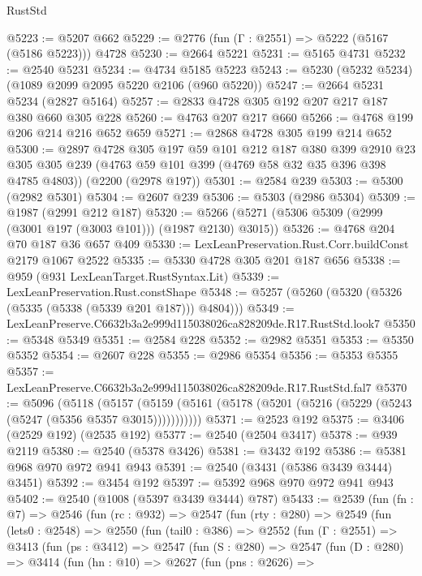 \begin{lexlean}{RustStd}
\begin{coremodule}
@5223 := @5207 @662
@5229 := @2776 (fun (Γ : @2551) => @5222 (@5167 (@5186 @5223))) @4728
@5230 := @2664 @5221
@5231 := @5165 @4731
@5232 := @2540 @5231
@5234 := @4734 @5185 @5223
@5243 := @5230 (@5232 @5234) (@1089 @2099 @2095 @5220 @2106 (@960 @5220))
@5247 := @2664 @5231 @5234 (@2827 @5164)
@5257 := @2833 @4728 @305 @192 @207 @217 @187 @380 @660 @305 @228
@5260 := @4763 @207 @217 @660
@5266 := @4768 @199 @206 @214 @216 @652 @659
@5271 := @2868 @4728 @305 @199 @214 @652
@5300 := @2897
    @4728
    @305
    @197
    @59
    @101
    @212
    @187
    @380
    @399
    @2910
    @23
    @305
    @305
    @239
    (@4763 @59 @101 @399 (@4769 @58 @32 @35 @396 @398 @4785 @4803))
    (@2200 (@2978 @197))
@5301 := @2584 @239
@5303 := @5300 (@2982 @5301)
@5304 := @2607 @239
@5306 := @5303 (@2986 @5304)
@5309 := @1987 (@2991 @212 @187)
@5320 := @5266 (@5271 (@5306 @5309 (@2999 (@3001 @197 (@3003 @101))) (@1987 @2130) @3015))
@5326 := @4768 @204 @70 @187 @36 @657 @409
@5330 := LexLeanPreservation.Rust.Corr.buildConst @2179 @1067 @2522
@5335 := @5330 @4728 @305 @201 @187 @656
@5338 := @959 (@931 LexLeanTarget.RustSyntax.Lit)
@5339 := LexLeanPreservation.Rust.constShape
@5348 := @5257 (@5260 (@5320 (@5326 (@5335 (@5338 (@5339 @201 @187))) @4804)))
@5349 := LexLeanPreserve.C6632b3a2e999d115038026ca828209de.R17.RustStd.look7
@5350 := @5348 @5349
@5351 := @2584 @228
@5352 := @2982 @5351
@5353 := @5350 @5352
@5354 := @2607 @228
@5355 := @2986 @5354
@5356 := @5353 @5355
@5357 := LexLeanPreserve.C6632b3a2e999d115038026ca828209de.R17.RustStd.fal7
@5370 := @5096
    (@5118
      (@5157 (@5159 (@5161 (@5178 (@5201 (@5216 (@5229 (@5243 (@5247 (@5356 @5357 @3015)))))))))))
@5371 := @2523 @192
@5375 := @3406 (@2529 @192) (@2535 @192)
@5377 := @2540 (@2504 @3417)
@5378 := @939 @2119
@5380 := @2540 (@5378 @3426)
@5381 := @3432 @192
@5386 := @5381 @968 @970 @972 @941 @943
@5391 := @2540 (@3431 (@5386 @3439 @3444) @3451)
@5392 := @3454 @192
@5397 := @5392 @968 @970 @972 @941 @943
@5402 := @2540 (@1008 (@5397 @3439 @3444) @787)
@5433 := @2539
    (fun (fn : @7) =>
    @2546
      (fun (rc : @932) =>
      @2547
        (fun (rty : @280) =>
        @2549
          (fun (lets0 : @2548) =>
          @2550
            (fun (tail0 : @386) =>
            @2552
              (fun (Γ : @2551) =>
              @3413
                (fun (ps : @3412) =>
                @2547
                  (fun (S : @280) =>
                  @2547
                    (fun (D : @280) =>
                    @3414
                      (fun (hn : @10) =>
                      @2627
                        (fun (pns : @2626) =>

\end{coremodule}
\end{lexlean}
